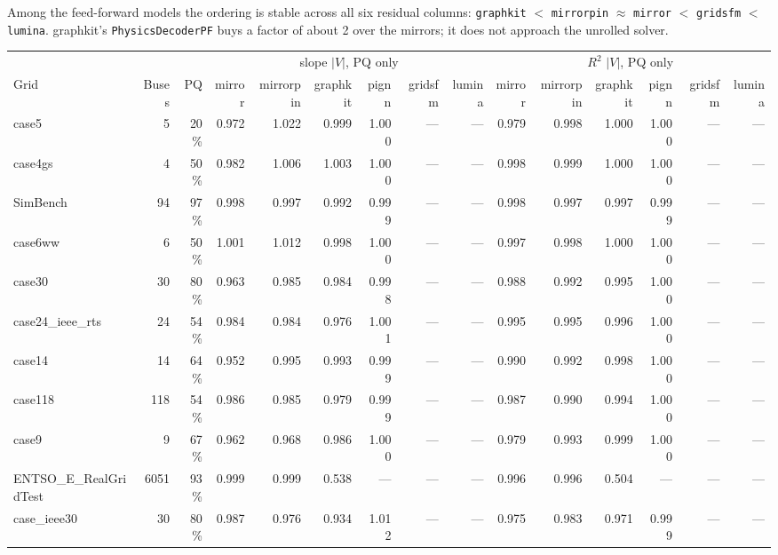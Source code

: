 \documentclass[10pt]{article}
\begin{document}
Among the feed-forward models the ordering is stable across all six residual
columns: \texttt{graphkit} $<$ \texttt{mirrorpin} $\approx$ \texttt{mirror} $<$
\texttt{gridsfm} $<$ \texttt{lumina}. graphkit's \texttt{PhysicsDecoderPF} buys
a factor of about 2 over the mirrors; it does not approach the unrolled solver.

\begin{landscape}
\begin{table}[H]
\centering\scriptsize
\begin{tabular}{lrr rrrrrr rrrrrr}
\toprule
 & & & \multicolumn{6}{c}{slope $|V|$, PQ only} & \multicolumn{6}{c}{$R^2$ $|V|$, PQ only} \\
\cmidrule(lr){4-9}\cmidrule(lr){10-15}
Grid & Buses & PQ & mirror & mirrorpin & graphkit & pignn & gridsfm & lumina & mirror & mirrorpin & graphkit & pignn & gridsfm & lumina \\
\midrule
case5 & 5 & 20\% & 0.972 & 1.022 & 0.999 & 1.000 & --- & --- & 0.979 & 0.998 & 1.000 & 1.000 & --- & --- \\
case4gs & 4 & 50\% & 0.982 & 1.006 & 1.003 & 1.000 & --- & --- & 0.998 & 0.999 & 1.000 & 1.000 & --- & --- \\
SimBench & 94 & 97\% & 0.998 & 0.997 & 0.992 & 0.999 & --- & --- & 0.998 & 0.997 & 0.997 & 0.999 & --- & --- \\
case6ww & 6 & 50\% & 1.001 & 1.012 & 0.998 & 1.000 & --- & --- & 0.997 & 0.998 & 1.000 & 1.000 & --- & --- \\
case30 & 30 & 80\% & 0.963 & 0.985 & 0.984 & 0.998 & --- & --- & 0.988 & 0.992 & 0.995 & 1.000 & --- & --- \\
case24\_ieee\_rts & 24 & 54\% & 0.984 & 0.984 & 0.976 & 1.001 & --- & --- & 0.995 & 0.995 & 0.996 & 1.000 & --- & --- \\
case14 & 14 & 64\% & 0.952 & 0.995 & 0.993 & 0.999 & --- & --- & 0.990 & 0.992 & 0.998 & 1.000 & --- & --- \\
case118 & 118 & 54\% & 0.986 & 0.985 & 0.979 & 0.999 & --- & --- & 0.987 & 0.990 & 0.994 & 1.000 & --- & --- \\
case9 & 9 & 67\% & 0.962 & 0.968 & 0.986 & 1.000 & --- & --- & 0.979 & 0.993 & 0.999 & 1.000 & --- & --- \\
ENTSO\_E\_RealGridTest & 6051 & 93\% & 0.999 & 0.999 & 0.538 & --- & --- & --- & 0.996 & 0.996 & 0.504 & --- & --- & --- \\
case\_ieee30 & 30 & 80\% & 0.987 & 0.976 & 0.934 & 1.012 & --- & --- & 0.975 & 0.983 & 0.971 & 0.999 & --- & --- \\

\end{tabular}
\end{table}
\end{landscape}
\end{document}
